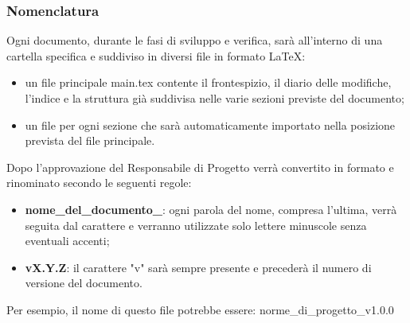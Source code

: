 	\subsubsection{Nomenclatura}
	Ogni documento, durante le fasi di sviluppo e verifica, sarà all'interno di una cartella specifica e suddiviso in diversi file in formato \LaTeX:
	\begin{itemize}
		\item un file principale main.tex contente il frontespizio, il diario delle modifiche, l'indice e la struttura già suddivisa nelle varie sezioni previste del documento;
		\item un file per ogni sezione che sarà automaticamente importato nella posizione prevista del file principale.
	\end{itemize}
	Dopo l'approvazione del Responsabile di Progetto verrà convertito in formato  e rinominato secondo le seguenti regole:
	\begin{itemize}
		\item \textbf{nome\_del\_documento\_}: ogni parola del nome, compresa l'ultima, verrà seguita dal carattere  e verranno utilizzate solo lettere minuscole senza eventuali accenti;
		\item \textbf{vX.Y.Z}: il carattere "v" sarà sempre presente e precederà il numero di versione del documento.
	\end{itemize}
	Per esempio, il nome di questo file potrebbe essere: norme\_di\_progetto\_v1.0.0\\	

